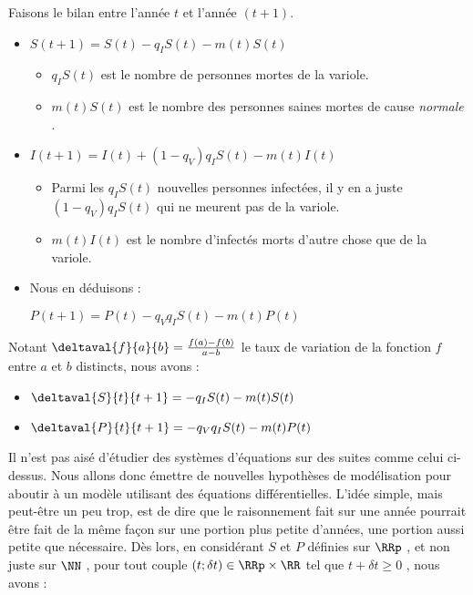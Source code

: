 

\medskip


Faisons le bilan entre l'année $t$ et l'année $(t + 1)$.

\begin{itemize}[label=\small\textbullet]
	\item $S(t + 1) = S(t) - q_I S(t) - m(t) S(t)$
	\begin{itemize}[label=$\rightarrow$]	
		\item $q_I S(t)$ est le nombre de personnes mortes de la variole.
		
		\item $m(t) S(t)$ est le nombre des personnes saines mortes de cause \emph{\og normale \fg}.
	\end{itemize}


	\item $I(t + 1) = I(t) + (1 - q_V) q_I S(t) - m(t) I(t)$
	\begin{itemize}[label=$\rightarrow$]	
		\item Parmi les $q_I S(t)$ nouvelles personnes infectées, il y en a juste $(1 - q_V) q_I S(t)$ qui ne meurent pas de la variole.
		
		\item $m(t) I(t)$ est le nombre d'infectés morts d'autre chose que de la variole.
	\end{itemize}


	\item Nous en déduisons :
	
	\noindent
	$P(t + 1) = P(t) - q_V q_I S(t) - m(t) P(t)$
\end{itemize}


Notant $\deltaval{f}{a}{b} = \frac{f(a) - f(b)}{a - b}$ le taux de variation de la fonction $f$ entre $a$ et $b$ distincts, nous avons :

\begin{itemize}[label=\small\textbullet]
	\item $\deltaval{S}{t}{t+1} = - q_I S(t) - m(t) S(t)$

	\item $\deltaval{P}{t}{t+1} = - q_V q_I S(t) - m(t) P(t)$
\end{itemize}




\medskip


Il n'est pas aisé d'étudier des systèmes d'équations sur des suites comme celui ci-dessus. Nous allons donc émettre de nouvelles hypothèses de modélisation pour aboutir à un modèle utilisant des équations différentielles.
L'idée simple, mais peut-être un peu trop, est de dire que le raisonnement fait sur une année pourrait être fait de la même façon sur une portion plus petite d'années, une portion aussi petite que nécessaire. Dès lors, en considérant $S$ et $P$ définies sur $\RRp$ , et non juste sur $\NN$ , pour tout couple $(t ; \delta t) \in \RRp \times \RR$ tel que $t + \delta t \geq 0$ , nous avons :

